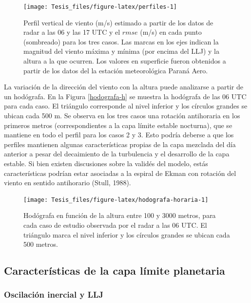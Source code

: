 \documentclass[12pt,spanish,oneside, a4paper]{book}
\begin{document}
\begin{figure}

{\centering \texttt{[image: Tesis\_files/figure-latex/perfiles-1]} 

}

\caption{Perfil vertical de viento (m/s) estimado a partir de los datos de radar a las 06 y las 17 UTC y el $rmse$ (m/s) en cada punto (sombreado) para los tres casos. Las marcas en los ejes indican la magnitud del viento máxima y mínima (por encima del LLJ) y la altura a la que ocurren. Los valores en superficie fueron obtenidos a partir de los datos del la estación meteorológica Paraná Aero. \label{perfiles-horarios}}\label{fig:perfiles}
\end{figure}

La variación de la dirección del viento con la altura puede analizarse a
partir de un hodógrafa. En la Figura \ref{hodografa-h} se muestra la
hodógrafa de las 06 UTC para cada caso. El triángulo corresponde al
nivel inferior y los círculos grandes se ubican cada 500 m. Se observa
en los tres casos una rotación antihoraria en los primeros metros
(correspondientes a la capa límite estable nocturna), que se mantiene en
todo el perfil para los casos 2 y 3. Esto podría deberse a que los
perfiles mantienen algunas características propias de la capa mezclada
del día anterior a pesar del decaimiento de la turbulencia y el
desarrollo de la capa estable. Si bien existen discusiones sobre la
validés del modelo, estás características podrían estar asociadas a la
espiral de Ekman con rotación del viento en sentido antihorario (Stull,
1988).

\begin{figure}

{\centering \texttt{[image: Tesis\_files/figure-latex/hodografa-horaria-1]} 

}

\caption{Hodógrafa en función de la altura entre 100 y 3000 metros, para cada caso de estudio observada por el radar a las 06 UTC. El triángulo marca el nivel inferior y los círculos grandes se ubican cada 500 metros. \label{hodografa-h}}\label{fig:hodografa-horaria}
\end{figure}

\subsection{Características de la capa límite
planetaria}\label{caracteristicas-de-la-capa-limite-planetaria}

\subsubsection{Oscilación inercial y
LLJ}\label{oscilacion-inercial-y-llj}
\end{document}
